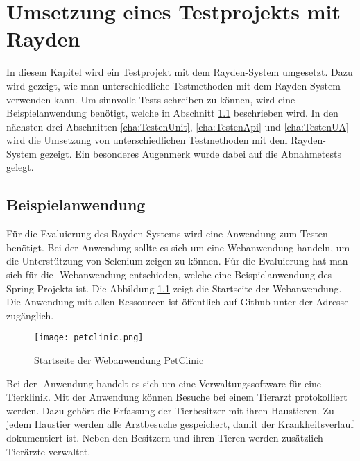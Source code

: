 \chapter{Umsetzung eines Testprojekts mit Rayden}
\label{cha:Testen}

In diesem Kapitel wird ein Testprojekt mit dem Rayden-System umgesetzt. Dazu wird gezeigt, wie man unterschiedliche Testmethoden mit dem Rayden-System verwenden kann. Um sinnvolle Tests schreiben zu können, wird eine Beispielanwendung benötigt, welche in Abschnitt \ref{cha:demoapp} beschrieben wird. In den nächsten drei Abschnitten \ref{cha:TestenUnit}, \ref{cha:TestenApi} und \ref{cha:TestenUA} wird die Umsetzung von unterschiedlichen Testmethoden mit dem Rayden-System gezeigt. Ein besonderes Augenmerk wurde dabei auf die Abnahmetests gelegt.


\section{Beispielanwendung}
\label{cha:demoapp}

Für die Evaluierung des Rayden-Systems wird eine Anwendung zum Testen benötigt. Bei der Anwendung sollte es sich um eine Webanwendung handeln, um die Unterstützung von Selenium zeigen zu können. Für die Evaluierung hat man sich für die -Webanwendung entschieden, welche eine Beispielanwendung des Spring-Projekts ist. Die Abbildung \ref{fig:petClinicPage} zeigt die Startseite der Webanwendung. Die Anwendung mit allen Ressourcen ist öffentlich auf Github unter der Adresse  zugänglich.

\begin{figure}
\centering
\texttt{[image: petclinic.png]}
\caption{Startseite der Webanwendung PetClinic}
\label{fig:petClinicPage}
\end{figure}

\SuperPar
Bei der -Anwendung handelt es sich um eine Verwaltungssoftware für eine Tierklinik. Mit der Anwendung können Besuche bei einem Tierarzt protokolliert werden. Dazu gehört die Erfassung der Tierbesitzer mit ihren Haustieren. Zu jedem Haustier werden alle Arztbesuche gespeichert, damit der Krankheitsverlauf dokumentiert ist. Neben den Besitzern und ihren Tieren werden zusätzlich Tierärzte verwaltet. 

